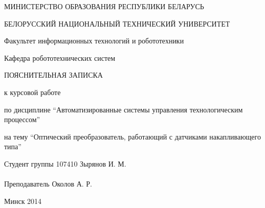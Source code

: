 \begin{titlepage} %

\thispagestyle{empty} %

\begin{center}
МИНИСТЕРСТВО ОБРАЗОВАНИЯ РЕСПУБЛИКИ БЕЛАРУСЬ

БЕЛОРУССКИЙ НАЦИОНАЛЬНЫЙ ТЕХНИЧЕСКИЙ УНИВЕРСИТЕТ

Факультет информационных технологий и робототехники

Кафедра робототехнических систем
\end{center}

\vfill

\begin{center}
    \large{ПОЯСНИТЕЛЬНАЯ ЗАПИСКА}

    \normalsize{к курсовой работе}

    \normalsize{по дисциплине ``Автоматизированные системы управления технологическим процессом''}

    \normalsize{на тему ``Оптический преобразователь, работающий с датчиками накапливающего типа''}
\end{center}

\vfill

\noindent
Студент группы 107410 \hfill Зырянов И. М.
\\
\\
\noindent
Преподаватель \hfill Околов А. Р.

\vfill

\centerline{Минск 2014}

\clearpage %

\end{titlepage}

\setcounter{page}{4}

